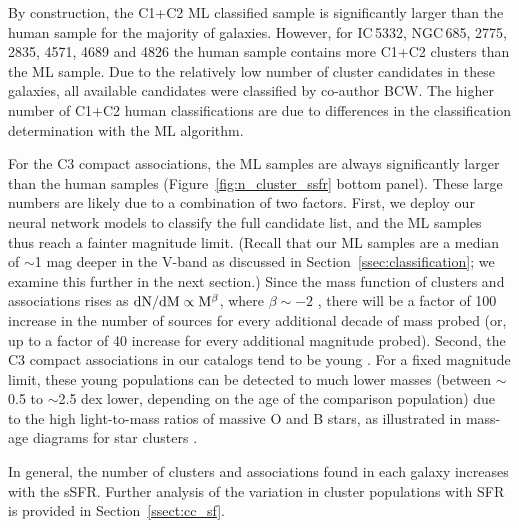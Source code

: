 \documentclass[]{aastex631}
\begin{document}
By construction, the C1+C2 ML classified sample is significantly larger than the human sample for the majority of galaxies. 
However, for IC\,5332, NGC\,685, 2775, 2835, 4571, 4689 and 4826 the human sample contains more C1+C2 clusters than the ML sample. Due to the relatively low number of cluster candidates in these galaxies, all available candidates were classified by co-author BCW. The higher number of C1+C2 human classifications are due to differences in the classification determination with the ML algorithm.

For the C3 compact associations, the ML samples are always significantly larger than the human samples (Figure~\ref{fig:n_cluster_ssfr} bottom panel). 
These large numbers are likely due to a combination of two factors.
First, we deploy our neural network models to classify the full candidate list, and the ML samples thus reach a fainter magnitude limit.  (Recall that our ML samples are a median of $\sim$1 mag deeper in the V-band as discussed in Section~\ref{ssec:classification}; we examine this further in the next section.)  Since the mass function of clusters and associations rises as $\rm{dN/dM} \propto M{^\beta}$, where $\beta\sim-2$ \citep[and references therein]{krumholz_star_2019}, there will be a factor of 100 increase in the number of sources for every additional decade of mass probed (or, up to a factor of 40 increase for every additional magnitude probed).  Second, the C3 compact associations in our catalogs tend to be young \citep[$\lesssim$10 Myr, e.g.,][see also Sec~\ref{ssect:cc_regions}]{lee_phangs-hst_2022}.  For a fixed magnitude limit, these young populations can be detected to much lower masses (between $\sim$0.5 to $\sim$2.5 dex lower, depending on the age of the comparison population) due to the high light-to-mass ratios of massive O and B stars, as illustrated in mass-age diagrams for star clusters \citep[e.g.,][Figure 13]{cook_star_2019}.  

In general, the number of clusters and associations found in each galaxy increases with the sSFR.  Further analysis of the variation in cluster populations with SFR is provided in Section~\ref{ssect:cc_sf}.
\end{document}
